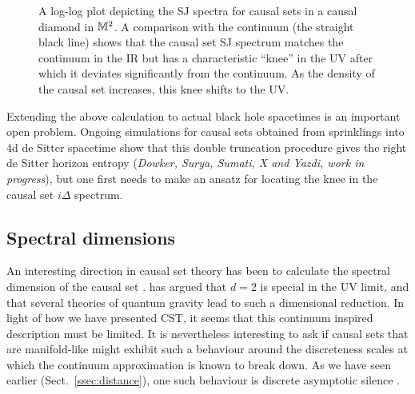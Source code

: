 \begin{figure}[ht]
  \centering {} 
  \caption{A log-log plot depicting the SJ spectra  for causal sets in a causal diamond in $\mathbb M^2$. A comparison with the
      continuum (the straight black line) shows that the causal set SJ spectrum matches the continuum in the IR but has
      a characteristic ``knee'' in the UV after which it deviates significantly from the continuum. As the density of the
      causal set increases, this knee shifts to the UV.}
\label{spectrum.fig} 
\end{figure}



Extending the above calculation to actual black hole spacetimes is an important open problem. Ongoing simulations for
causal sets obtained from sprinklings into 4d de
Sitter spacetime show that this double truncation  procedure gives the right de Sitter horizon entropy ({\it Dowker, Surya,
Sumati, X  and Yazdi, work in progress}),
but one first needs to make an ansatz for 
locating  the knee in the causal set $i \Delta$ spectrum. 
 

\subsection{Spectral dimensions}
\label{ssec:specdim}

An interesting direction in causal set theory has been to calculate the spectral dimension of the causal set
\citep{em,diondr,carlipdr}. \cite{carlipdr} has argued that $d=2$ is special in the UV limit, and that several theories of quantum
gravity lead to such a dimensional reduction. In light of how we have presented CST, it seems that
this continuum inspired description must be limited. It is nevertheless interesting to ask if causal sets that
are manifold-like might exhibit such a behaviour around the discreteness scales at which the continuum approximation is
known to break down. As we have seen earlier (Sect.~\ref{ssec:distance}), one such behaviour is discrete asymptotic silence \citep{ems}.


